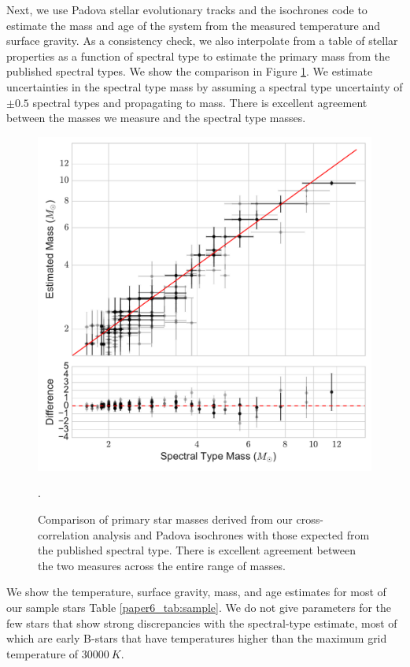 Next, we use Padova stellar evolutionary tracks \citep{Bressan2012} and the isochrones code \citep{isochrones_code} to estimate the mass and age of the system from the measured temperature and surface gravity. As a consistency check, we also interpolate from a table of stellar properties as a function of spectral type \citep{Pecaut2013} to estimate the primary mass from the published spectral types. We show the comparison in Figure \ref{paper6_fig:prim_mass}. We estimate uncertainties in the spectral type mass by assuming a spectral type uncertainty of $\pm 0.5$ spectral types and propagating to mass. There is excellent agreement between the masses we measure and the spectral type masses.

\begin{figure}
\includegraphics[width=\columnwidth]{Figures/paper6_PrimaryMassEstimates_log.pdf}
\caption{Comparison of primary star masses derived from our cross-correlation analysis and Padova isochrones \citep{Bressan2012} with those expected from the published spectral type. There is excellent agreement between the two measures across the entire range of masses.}
\label{paper6_fig:prim_mass}.
\end{figure}

We show the temperature, surface gravity, mass, and age estimates for most of our sample stars Table \ref{paper6_tab:sample}. We do not give parameters for the few stars that show strong discrepancies with the spectral-type estimate, most of which are early B-stars that have temperatures higher than the maximum grid temperature of $30000\ K$. 





